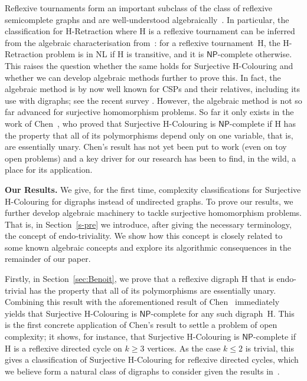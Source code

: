 \documentclass[a4paper,12pt]{article}
\theoremstyle{remark}
\newcommand{\NP}[0]{\ensuremath{\mathsf{NP}}}
\renewcommand{\H}{\ensuremath{\mathrm{H}}}
\begin{document}
Reflexive tournaments form an important subclass of the class of reflexive semicomplete graphs
and are well-understood algebraically~\cite{larose2006taylor}.  
In particular,
the classification for {\sc $\H$-Retraction} where $\H$ is a reflexive tournament can be inferred from 
the algebraic characterisation from~\cite{larose2006taylor}: for a reflexive tournament~$\H$, the {\sc $\H$-Retraction} problem is in NL if $\H$ is transitive, and it is \NP-complete otherwise. This raises the question whether the same holds for {\sc Surjective $\H$-Colouring} and whether we can develop algebraic methods further to prove this.
In fact, the algebraic method is by now well known for CSPs and their relatives, including its use with digraphs; see the recent survey \cite{LaroseSurvey17}. However, the algebraic method is not so far advanced for surjective homomorphism problems.
So far it only exists in the work of Chen~\cite{ChenSurHom}, who proved that {\sc Surjective $\H$-Colouring} is \NP-complete if $\H$ 
has the property that all of its polymorphisms depend only on one variable, that is, are essentially unary. 
Chen's result has not yet been put to work (even on toy open problems) and a key driver for our research has been to find, in the wild, a place for its application. 



\medskip
\noindent
{\bf Our Results.}
We give, for the first time, complexity classifications for {\sc Surjective $\H$-Colouring} for digraphs instead of undirected graphs.
To prove our results, we further develop algebraic machinery to tackle surjective homomorphism problems. That is, in Section~\ref{s-pre} we introduce, after giving the necessary terminology, the concept of 
endo-triviality. We show how this concept is closely related to some known algebraic concepts and
explore its algorithmic consequences in the remainder of our paper.

Firstly, in Section~\ref{sec:Benoit}, we prove that a reflexive digraph $\H$ that is 
endo-trivial
has the property that all of its polymorphisms are essentially unary. Combining this result with the aforementioned result of Chen~\cite{ChenSurHom} immediately yields that
{\sc Surjective $\H$-Colouring} is \NP-complete for any such digraph~$\H$. This is 
the first concrete application of Chen's result to settle a problem of open complexity;
it shows, for instance, that {\sc Surjective $\H$-Colouring} is \NP-complete if $\H$ is a reflexive directed cycle on $k\geq 3$ vertices.
As the case $k\leq 2$ is trivial, this gives a classification of {\sc Surjective $\H$-Colouring} for reflexive directed cycles, which we believe form  a natural class of digraphs to consider given the results in~\cite{JCTBMartinPaulusma,VikasMFCS}.
\end{document}
